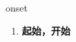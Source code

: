 
\begin{frame}
{\huge onset}
\begin{center}
\begin{enumerate}\Large
  \item \textbf{起始，开始}
\end{enumerate}
\end{center}
\end{frame}
